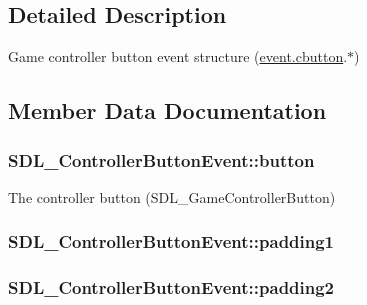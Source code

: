 \subsection{Detailed Description}
Game controller button event structure (\hyperlink{union_s_d_l___event_aee2b5671c8dcdb447023715cc21593cb}{event.\+cbutton}.$\ast$) 

\subsection{Member Data Documentation}
\subsubsection[{\texorpdfstring{button}{button}}]{ S\+D\+L\+\_\+\+Controller\+Button\+Event\+::button}\hypertarget{struct_s_d_l___controller_button_event_a039da6cd31c3c62e62a3ae17cc64d0db}{}\label{struct_s_d_l___controller_button_event_a039da6cd31c3c62e62a3ae17cc64d0db}
The controller button (S\+D\+L\+\_\+\+Game\+Controller\+Button) 
\subsubsection[{\texorpdfstring{padding1}{padding1}}]{ S\+D\+L\+\_\+\+Controller\+Button\+Event\+::padding1}\hypertarget{struct_s_d_l___controller_button_event_a34d3e43fc1994288b9b083c874bc0899}{}\label{struct_s_d_l___controller_button_event_a34d3e43fc1994288b9b083c874bc0899}
\subsubsection[{\texorpdfstring{padding2}{padding2}}]{ S\+D\+L\+\_\+\+Controller\+Button\+Event\+::padding2}\hypertarget{struct_s_d_l___controller_button_event_a8caf56a3921227913cfb652d5de1eec4}{}\label{struct_s_d_l___controller_button_event_a8caf56a3921227913cfb652d5de1eec4}

